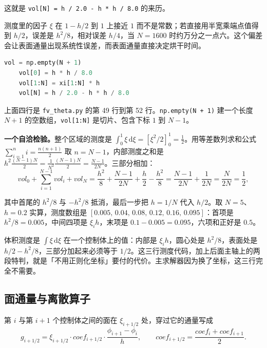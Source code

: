 这就是 \texttt{vol[N] = h / 2.0 - h * h / 8.0} 的来历。

测度里的因子 $\xi$ 在 $1-h/2$ 到 $1$ 上接近 $1$ 而不是常数；若直接用半宽乘端点值得到 $h/2$，误差是 $h^2/8$，相对误差 $h/4$，当 $N=1600$ 时约万分之一点六。这个偏差会让表面通量出现系统性误差，而表面通量直接决定烘干时间。

\begin{lstlisting}[language=Python]
    vol = np.empty(N + 1)
    vol[0] = h * h / 8.0
    vol[1:N] = xi[1:N] * h
    vol[N] = h / 2.0 - h * h / 8.0
\end{lstlisting}

上面四行是 \texttt{fv\_theta.py} 的第 49 行到第 52 行。\texttt{np.empty(N + 1)} 建一个长度 $N+1$ 的空数组，\texttt{vol[1:N]} 是切片、包含下标 $1$ 到 $N-1$。

\textbf{一个自洽检验。}整个区域的测度是 $\int_0^1\xi\,\mathrm{d}\xi=\left[\xi^2/2\right]_0^1=\frac12$。用等差数列求和公式 $\sum_{i=1}^{n}i=\frac{n(n+1)}{2}$ 取 $n=N-1$，内部测度之和是 $h^2\frac{(N-1)N}{2}=\frac{1}{N^2}\frac{(N-1)N}{2}=\frac{N-1}{2N}$。三部分相加：
\begin{equation}
vol_0+\sum_{i=1}^{N-1}vol_i+vol_N
=\frac{h^2}{8}+\frac{N-1}{2N}+\frac{h}{2}-\frac{h^2}{8}
=\frac{N-1}{2N}+\frac{1}{2N}=\frac{N}{2N}=\frac12,
\end{equation}

其中首尾的 $h^2/8$ 与 $-h^2/8$ 抵消，最后一步把 $h=1/N$ 代入 $h/2$。取 $N=5$、$h=0.2$ 实算，测度数组是 $[0.005,\,0.04,\,0.08,\,0.12,\,0.16,\,0.095]$：首项是 $h^2/8=0.005$，中间四项是 $\xi_ih$，末项是 $0.1-0.005=0.095$，六项和正好是 $0.5$。

\keypoint
体积测度是 $\int\xi\,\mathrm{d}\xi$ 在一个控制体上的值：内部是 $\xi_ih$，圆心处是 $h^2/8$，表面处是 $h/2-h^2/8$，三部分加起来必须等于 $1/2$。这三行测度代码，加上后面主轴上的两段特判，就是「不用正则化坐标」要付的代价。主求解器因为换了坐标，这三行完全不需要。

\subsection{面通量与离散算子}

第 $i$ 与第 $i+1$ 个控制体之间的面在 $\xi_{i+1/2}$ 处，穿过它的通量写成
\begin{equation}
g_{i+1/2}=\xi_{i+1/2}\cdot coef_{i+1/2}\cdot\frac{\phi_{i+1}-\phi_i}{h},
\qquad
coef_{i+1/2}=\frac{coef_i+coef_{i+1}}{2}.
\label{eq:p5-face}
\end{equation}

